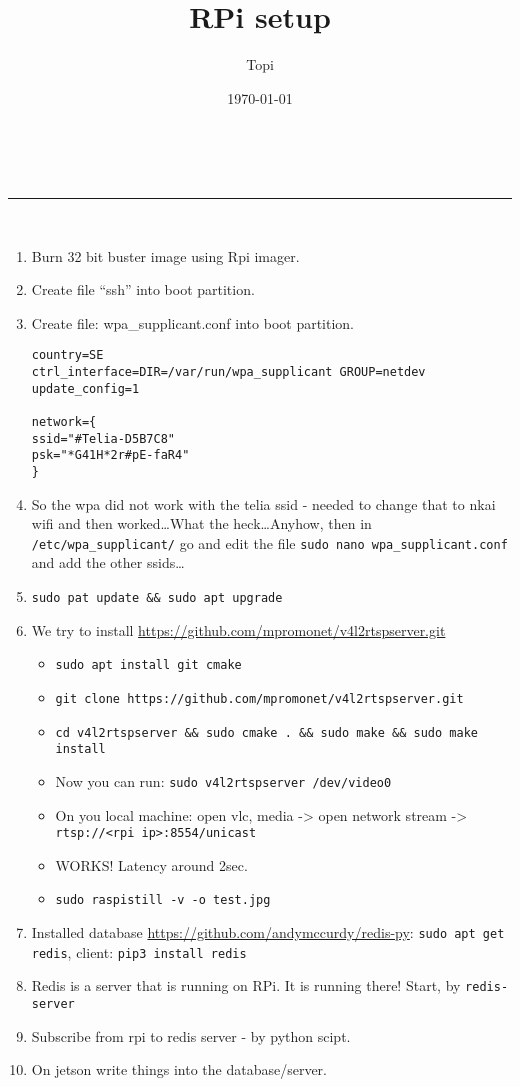 \documentclass[a4paper,11pt]{article}
\makeatletter
\newcommand{\linia}{\rule{\linewidth}{0.5pt}}
\renewcommand{\maketitle}{
\begin{center}
\vspace{2ex}
{\huge \textsc{\@title}}
\vspace{1ex}
\\
\linia\\
\@author \hfill \@date
\vspace{4ex}
\end{center}
}
\makeatother
\begin{document}
\title{RPi setup}
\author{Topi}
\date{\today}

\maketitle

\begin{enumerate}
	\item Burn 32 bit buster image using Rpi imager.
	\item Create file ``ssh'' into boot partition.
	\item Create file: wpa\_supplicant.conf into boot partition.
	\begin{lstlisting}
country=SE
ctrl_interface=DIR=/var/run/wpa_supplicant GROUP=netdev
update_config=1

network={
ssid="#Telia-D5B7C8"
psk="*G41H*2r#pE-faR4"
}
\end{lstlisting}
	\item So the wpa did not work with the telia ssid - needed to change that to nkai wifi and then worked\dots What the heck\dots Anyhow, then in \texttt{/etc/wpa\_supplicant/} go and edit the file \texttt{sudo nano wpa\_supplicant.conf} and add the other ssids\dots
	\item \texttt{sudo pat update \&\& sudo apt upgrade}
	\item We try to install \url{https://github.com/mpromonet/v4l2rtspserver.git}
	\begin{itemize}
	\item \texttt{sudo apt install git cmake}
	\item \texttt{git clone https://github.com/mpromonet/v4l2rtspserver.git}
	\item \texttt{cd v4l2rtspserver \&\& sudo cmake . \&\& sudo make \&\& sudo make install}
	\item Now you can run: \texttt{sudo v4l2rtspserver /dev/video0}
	\item On you local machine: open vlc, media -> open network stream -> \texttt{rtsp://<rpi ip>:8554/unicast}
	\item WORKS! Latency around 2sec.
	\item \texttt{sudo raspistill -v -o test.jpg}
	\end{itemize}

\item Installed database \url{https://github.com/andymccurdy/redis-py}: \texttt{sudo apt get redis}, client: \texttt{pip3 install redis}
	\item Redis is a server that is running on RPi. It is running there! Start, by \texttt{redis-server}
	\item Subscribe from rpi to redis server - by python scipt.
	\item On jetson write things into the database/server. 
\end{enumerate}
\end{document}
